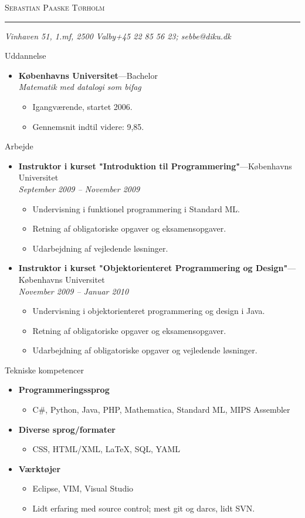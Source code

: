 \documentclass[11pt,oneside]{article}
\makeatletter
\newcommand{\name}{Sebastian Paaske Tørholm}
\newcommand{\addr}{Vinhaven 51, 1.mf, 2500 Valby}
\newcommand{\phone}{+45 22 85 56 23}
\newcommand{\email}{sebbe@diku.dk}
\newcommand{\bigname}[1]{
	\begin{center}\fontfamily{phv}\selectfont\Huge\scshape#1\end{center}
}
\newenvironment{ressection}[1]{
	\vspace{4pt}
	{\fontfamily{phv}\selectfont\Large#1}
	\begin{itemize}
	\vspace{3pt}
}{
	\end{itemize}
}
\newcommand{\resitem}[1]{
	\vspace{-4pt}
	\item \begin{flushleft} #1 \end{flushleft}
}
\newcommand{\ressubitem}[1]{
	\vspace{-1pt}
	\item \begin{flushleft} #1 \end{flushleft}
}
\newcommand{\resbigitem}[3]{
	\vspace{-5pt}
	\item
	\textbf{#1}---#2 \\
	\textit{#3}
}
\newenvironment{ressubsec}[3]{
	\resbigitem{#1}{#2}{#3}
	\vspace{-2pt}
	\begin{itemize}
}{
	\end{itemize}
}
\newenvironment{reslist}[1]{
	\resitem{\textbf{#1}}
	\vspace{-5pt}
	\begin{itemize}
}{
	\end{itemize}
}
\makeatother
\begin{document}
 \selectfont

\bigname{\name}

\vspace{-8pt} \rule{\textwidth}{1pt}

\vspace{-1pt} {\small\itshape \addr \hfill \phone; \email}

\vspace{8 pt}




\begin{ressection}{Uddannelse}

	\begin{ressubsec}{Københavns Universitet}{Bachelor}{Matematik med datalogi som bifag}
		\ressubitem{Igangværende, startet 2006.}
		\ressubitem{Gennemsnit indtil videre: 9,85.}
	\end{ressubsec}

\end{ressection}


\begin{ressection}{Arbejde}

	\begin{ressubsec}{Instruktor i kurset "Introduktion til Programmering"}{Københavns Universitet}{September 2009 -- November 2009}
		\ressubitem{Undervisning i funktionel programmering i Standard ML.}
		\ressubitem{Retning af obligatoriske opgaver og eksamensopgaver.}
		\ressubitem{Udarbejdning af vejledende løsninger.}
	\end{ressubsec}

	\begin{ressubsec}{Instruktor i kurset "Objektorienteret Programmering og Design"}{Københavns Universitet}{November 2009 -- Januar 2010}
		\ressubitem{Undervisning i objektorienteret programmering og design i Java.}
		\ressubitem{Retning af obligatoriske opgaver og eksamensopgaver.}
		\ressubitem{Udarbejdning af obligatoriske opgaver og vejledende løsninger.}
	\end{ressubsec}

\end{ressection}


\begin{ressection}{Tekniske kompetencer}
	\begin{reslist}{Programmeringssprog}
		\resitem{C\#, Python, Java, PHP, Mathematica, Standard ML, MIPS Assembler}
	\end{reslist}
	
	\begin{reslist}{Diverse sprog/formater}
		\resitem{CSS, HTML/XML, \LaTeX, SQL, YAML}
	\end{reslist}
	
	\begin{reslist}{Værktøjer}
		\resitem{Eclipse, VIM, Visual Studio}
		\resitem{Lidt erfaring med source control; mest git og darcs, lidt SVN.}
	\end{reslist}
\end{ressection}
\end{document}
